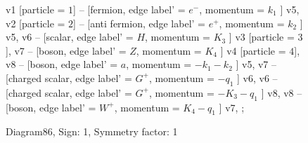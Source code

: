 \documentclass{revtex4}
\begin{document}
\begin{figure}[!htb]
\begin{center}
{    %
v1 [particle = \(1\)] -- [fermion, edge label' = \(e^{-}\), momentum = \(k_{1}\) ] v5, 
v2 [particle = \(2\)] -- [anti fermion, edge label' = \(e^{+}\), momentum = \(k_{2}\) ] v5, 
v6 -- [scalar, edge label' = \(H\), momentum = \(K_{3}\) ] v3 [particle = \(3\)], 
v7 -- [boson, edge label' = \(Z\), momentum = \(K_{4}\) ] v4 [particle = \(4\)], 
v8 -- [boson, edge label' = \(a\), momentum = \(-k_{1} - k_{2}\) ] v5, 
v7 -- [charged scalar, edge label' = \(G^{+}\), momentum = \(-q_{1}\) ] v6, 
v6 -- [charged scalar, edge label' = \(G^{+}\), momentum = \(-K_{3} - q_{1}\) ] v8, 
v8 -- [boson, edge label' = \(W^{+}\), momentum = \(K_{4} - q_{1}\) ] v7, 
};
\end{center}
\caption{Diagram86, Sign: 1, Symmetry factor: 1}
\end{figure}
\newpage
\end{document}

